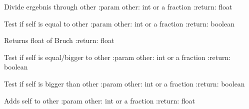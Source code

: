 \documentclass[letterpaper,10pt,english]{sphinxmanual}
\begin{document}
\begin{fulllineitems}

\begin{fulllineitems}
\label{bruch:bruch.Bruch.__div__}
Divide ergebnis through other
:param other: int or a fraction
:return: float

\end{fulllineitems}


\begin{fulllineitems}
\label{bruch:bruch.Bruch.__eq__}
Test if self is equal to other
:param other: int or a fraction
:return: boolean

\end{fulllineitems}


\begin{fulllineitems}
\label{bruch:bruch.Bruch.__float__}
Returns float of Bruch
:return: float

\end{fulllineitems}


\begin{fulllineitems}
\label{bruch:bruch.Bruch.__ge__}
Test if self is equal/bigger to other
:param other: int or a fraction
:return: boolean

\end{fulllineitems}


\begin{fulllineitems}
\label{bruch:bruch.Bruch.__gt__}
Test if self is bigger than other
:param other: int or a fraction
:return: boolean

\end{fulllineitems}


\begin{fulllineitems}
\label{bruch:bruch.Bruch.__iadd__}
Adds self to other
:param other: int or a fraction
:return: float


\end{fulllineitems}
\end{fulllineitems}
\end{document}
